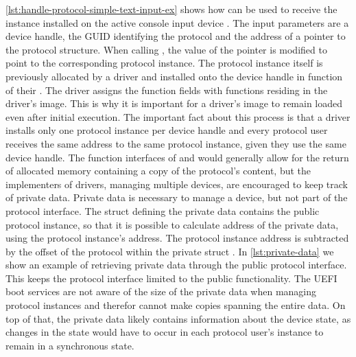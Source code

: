 \autoref{lst:handle-protocol-simple-text-input-ex} shows how  can be used to receive the  instance installed on the active console input device \cite[Section 4.3]{uefi-spec}.
The input parameters are a device handle, the \ac{GUID} identifying the protocol and the address of a pointer to the protocol structure.
When calling , the value of the pointer is modified to point to the corresponding protocol instance.
The protocol instance itself is previously allocated by a driver and installed onto the device handle in  function of their .
The driver assigns the function fields with functions residing in the driver's image.
This is why it is important for a driver's image to remain loaded even after initial execution.
The important fact about this process is that a driver installs only one protocol instance per device handle and every protocol user receives the same address to the same protocol instance, given they use the same device handle.
The function interfaces of  and  would generally allow for the return of allocated memory containing a copy of the protocol's content, but the implementers of drivers, managing multiple devices, are encouraged to keep track of private data.
Private data is necessary to manage a device, but not part of the protocol interface.
The struct defining the private data contains the public protocol instance, so that it is possible to calculate address of the private data, using the protocol instance's address.
The protocol instance address is subtracted by the offset of the protocol within the private struct \cite[Section 8]{tianocore-edk2-driver-writer-s-guide}.
In \autoref{lst:private-data} we show an example of retrieving private data through the public protocol interface.
This keeps the protocol interface limited to the public functionality.
The \ac{UEFI} boot services are not aware of the size of the private data when managing protocol instances and therefor cannot make copies spanning the entire data.
On top of that, the private data likely contains information about the device state, as changes in the state would have to occur in each protocol user's instance to remain in a synchronous state.

\vspace{1em}



